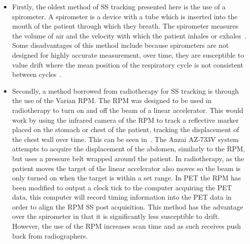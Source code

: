                 \begin{itemize}
                    \item Firstly, the oldest method of \gls{SS} tracking presented here is the use of a spirometer. A spirometer is a device with a tube which is inserted into the mouth of the patient through which they breath. The spirometer measures the volume of air and the velocity with which the patient inhales or exhales~\parencite{Guivarch2004SynchronizationPlethysmography}. Some disadvantages of this method include %
                    because spirometers are not designed for highly accurate measurement, over time, they are susceptible to value drift where the mean position of the respiratory cycle is not consistent between cycles~\parencite{Hoisak2004}.
                    
                    \item Secondly, a method borrowed from radiotherapy for \gls{SS} tracking is through the use of the Varian \gls{RPM}. The \gls{RPM} was designed to be used in radiotherapy to turn on and off the beam of a linear accelerator. This would work by using the infrared camera of the \gls{RPM} to track a reflective marker placed on the stomach or chest of the patient, tracking the displacement of the chest wall over time. This can be seen in~. The Anzai AZ-733V system attempts to acquire the displacement of the abdomen, similarly to the \gls{RPM}, but uses a pressure belt wrapped around the patient. In radiotherapy, as the patient moves the target of the linear accelerator also moves so the beam is only turned on when the target is within a set range. In \gls{PET} the \gls{RPM} has been modified to output a clock tick to the computer acquiring the \gls{PET} data, this computer will %
                    record timing information into the \gls{PET} data in order to align the \gls{RPM} \gls{SS} post acquisition. This method has the advantage over the spirometer in that it is significantly less susceptible to drift. However, the use of the \gls{RPM} increases scan time and as such receives push back from radiographers.
                    

\end{itemize}
